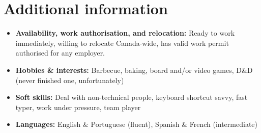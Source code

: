 \section{Additional information}

\begin{itemize}
    \item \textbf{Availability, work authorisation, and relocation:} Ready to work immediately, willing to relocate Canada-wide, has valid work permit authorised for any employer.
    \item \textbf{Hobbies \& interests:} Barbecue, baking, board and/or video games, D\&D (never finished one, unfortunately)
    \item \textbf{Soft skills:} Deal with non-technical people, keyboard shortcut savvy, fast typer, work under pressure, team player
    \item \textbf{Languages:} English \& Portuguese (fluent), Spanish \& French (intermediate)
\end{itemize}